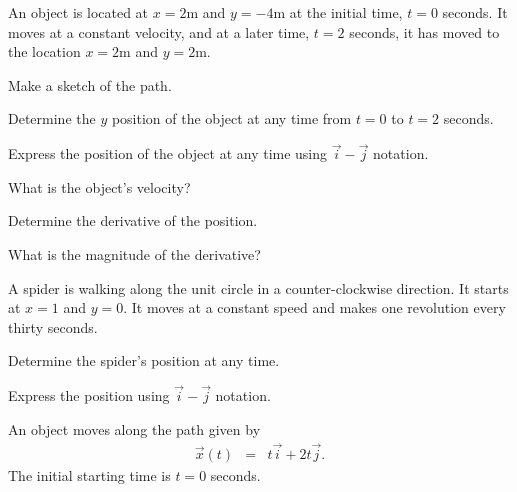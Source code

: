 \begin{problem}
\item An object is located at $x=2$m and $y=-4$m at the initial time,
  $t=0$ seconds. It moves at a constant velocity, and at a later time,
  $t=2$ seconds, it has moved to the location $x=2$m and $y=2$m.
  \begin{subproblem}
  \item Make a sketch of the path.
    \vfill
  \item Determine the $y$ position of the object at any time from
    $t=0$ to $t=2$ seconds.
    \vfill
  \item Express the position of the object at any time using
    $\vec{i}-\vec{j}$ notation.
    \vspace{3em}
  \item What is the object's velocity?
    \vspace{3em}

  \item Determine the derivative of the position.
    \vfill
  \item What is the magnitude of the derivative?
    \vfill

  \clearpage

  \end{subproblem}

  \clearpage

\item A spider is walking along the unit circle in a counter-clockwise
  direction. It starts at $x=1$ and $y=0$. It moves at a constant
  speed and makes one revolution every thirty seconds.

  \scalebox{0.35}{}

  \begin{subproblem}
  \item Determine the spider's position at any time.
    \vfill
  \item Express the position using $\vec{i}-\vec{j}$ notation.
    \vspace{5em}
  \end{subproblem}

  \clearpage


\item An object moves along the path given by
  \begin{eqnarray*}
    \vec{x}(t) & = & t \vec{i} + 2 t \vec{j}.
  \end{eqnarray*}
  The initial starting time is $t=0$ seconds.


\end{problem}
